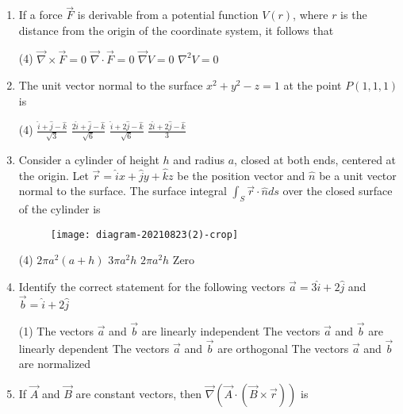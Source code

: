 \begin{enumerate}[label=\color{ocre}\textbf{\arabic*.}]
\item If a force $\vec{F}$ is derivable from a potential function $V(r)$, where $r$ is the distance from the origin of the coordinate system, it follows that
{}
\begin{tasks}(4)
	\task[\textbf{A.}] $\vec{\nabla} \times \vec{F}=0$
	\task[\textbf{B.}] $\vec{\nabla} \cdot \vec{F}=0$
	\task[\textbf{C.}] $\vec{\nabla} V=0$
	\task[\textbf{D.}] $\nabla^{2} V=0$
\end{tasks}
	\item The unit vector normal to the surface $x^{2}+y^{2}-z=1$ at the point $P(1,1,1)$ is
{}

\begin{tasks}(4)
	\task[\textbf{A.}] $\frac{\hat{i}+\hat{j}-\hat{k}}{\sqrt{3}}$
	\task[\textbf{B.}] $\frac{2 \hat{i}+\hat{j}-\hat{k}}{\sqrt{6}}$
	\task[\textbf{C.}] $\frac{\hat{i}+2 \hat{j}-\hat{k}}{\sqrt{6}}$
	\task[\textbf{D.}]  $\frac{2 \hat{i}+2 \hat{j}-\hat{k}}{3}$
\end{tasks}
\item Consider a cylinder of height $h$ and radius $a$, closed at both ends, centered at the origin. Let $\vec{r}=\hat{i} x+\hat{j} y+\hat{k} z$ be the position vector and $\hat{n}$ be a unit vector normal to the surface. The surface integral $\int_{S} \vec{r} \cdot \hat{n} d s$ over the closed surface of the cylinder is
{}

\begin{figure}[H]
	\centering
	\texttt{[image: diagram-20210823(2)-crop]}
\end{figure}
\begin{tasks}(4)
	\task[\textbf{A.}] $2 \pi a^{2}(a+h)$
	\task[\textbf{B.}] $3 \pi a^{2} h$
	\task[\textbf{C.}] $2 \pi a^{2} h$
	\task[\textbf{D.}] Zero
\end{tasks}
\item Identify the correct statement for the following vectors $\vec{a}=3 \hat{i}+2 \hat{j}$ and $\vec{b}=\hat{i}+2 \hat{j}$
{}
\begin{tasks}(1)
	\task[\textbf{A.}] The vectors $\vec{a}$ and $\vec{b}$ are linearly independent
	\task[\textbf{B.}] The vectors $\vec{a}$ and $\vec{b}$ are linearly dependent
	\task[\textbf{C.}] The vectors $\vec{a}$ and $\vec{b}$ are orthogonal
	\task[\textbf{D.}] The vectors $\vec{a}$ and $\vec{b}$ are normalized
\end{tasks}
	\item If $\vec{A}$ and $\vec{B}$ are constant vectors, then $\vec{\nabla}(\vec{A} \cdot(\vec{B} \times \vec{r}))$ is
{}


\end{enumerate}
